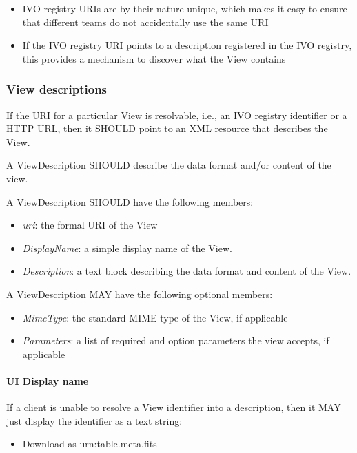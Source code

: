 \documentclass[11pt,a4paper]{ivoa}
\begin{document}
\begin{itemize}
    \item IVO registry URIs are by their nature unique, which makes it easy to ensure that different teams do not accidentally use the same URI
    \item If the IVO registry URI points to a description registered in the IVO registry, this provides a mechanism to discover what the View contains
\end{itemize}

\subsubsection{View descriptions}
\label{subsubsec:view descriptions}
If the URI for a particular View is resolvable, i.e., an IVO registry identifier or a HTTP URL, then it SHOULD point to an XML resource that describes the View.

A ViewDescription SHOULD describe the data format and/or content of the view.

A ViewDescription SHOULD have the following members:

\begin{itemize}
    \item \emph{uri}: the formal URI of the View
    \item \emph{DisplayName}: a simple display name of the View.
    \item \emph{Description}: a text block describing the data format and content of the View.
\end{itemize}

A ViewDescription MAY have the following optional members:

\begin{itemize}
    \item \emph{MimeType}: the standard MIME type of the View, if applicable
    \item \emph{Parameters}: a list of required and option parameters the view accepts, if applicable
\end{itemize}

\paragraph{UI Display name}
If a client is unable to resolve a View identifier into a description, then it MAY just display the identifier as a text string:

\begin{itemize}
    \item Download as urn:table.meta.fits
\end{itemize}
\end{document}
